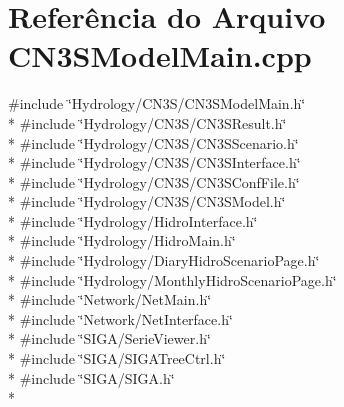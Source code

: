 \section{Referência do Arquivo C\+N3\+S\+Model\+Main.\+cpp}
\label{_c_n3_s_model_main_8cpp}
{\ttfamily \#include \char`\"{}Hydrology/\+C\+N3\+S/\+C\+N3\+S\+Model\+Main.\+h\char`\"{}}\\*
{\ttfamily \#include \char`\"{}Hydrology/\+C\+N3\+S/\+C\+N3\+S\+Result.\+h\char`\"{}}\\*
{\ttfamily \#include \char`\"{}Hydrology/\+C\+N3\+S/\+C\+N3\+S\+Scenario.\+h\char`\"{}}\\*
{\ttfamily \#include \char`\"{}Hydrology/\+C\+N3\+S/\+C\+N3\+S\+Interface.\+h\char`\"{}}\\*
{\ttfamily \#include \char`\"{}Hydrology/\+C\+N3\+S/\+C\+N3\+S\+Conf\+File.\+h\char`\"{}}\\*
{\ttfamily \#include \char`\"{}Hydrology/\+C\+N3\+S/\+C\+N3\+S\+Model.\+h\char`\"{}}\\*
{\ttfamily \#include \char`\"{}Hydrology/\+Hidro\+Interface.\+h\char`\"{}}\\*
{\ttfamily \#include \char`\"{}Hydrology/\+Hidro\+Main.\+h\char`\"{}}\\*
{\ttfamily \#include \char`\"{}Hydrology/\+Diary\+Hidro\+Scenario\+Page.\+h\char`\"{}}\\*
{\ttfamily \#include \char`\"{}Hydrology/\+Monthly\+Hidro\+Scenario\+Page.\+h\char`\"{}}\\*
{\ttfamily \#include \char`\"{}Network/\+Net\+Main.\+h\char`\"{}}\\*
{\ttfamily \#include \char`\"{}Network/\+Net\+Interface.\+h\char`\"{}}\\*
{\ttfamily \#include \char`\"{}S\+I\+G\+A/\+Serie\+Viewer.\+h\char`\"{}}\\*
{\ttfamily \#include \char`\"{}S\+I\+G\+A/\+S\+I\+G\+A\+Tree\+Ctrl.\+h\char`\"{}}\\*
{\ttfamily \#include \char`\"{}S\+I\+G\+A/\+S\+I\+G\+A.\+h\char`\"{}}\\*
